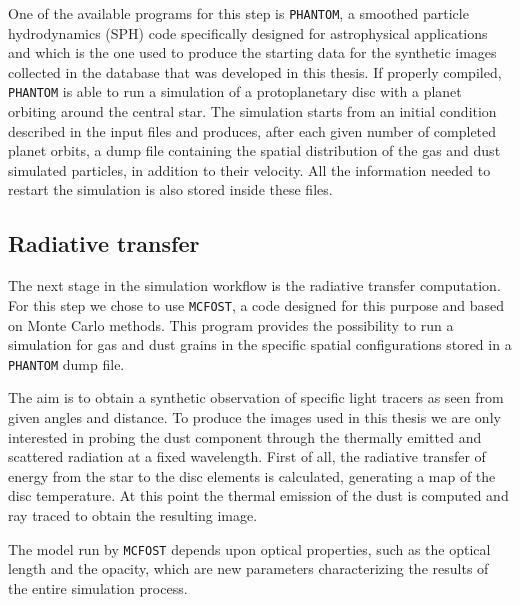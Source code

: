 \documentclass[a4paper,10pt]{report}
\begin{document}
One of the available programs for this step is \lstinline{PHANTOM}, a smoothed particle hydrodynamics (SPH) code 
specifically designed for astrophysical applications and which is the one used to produce
the starting data for the synthetic images collected in the database that was developed in this thesis.
If properly compiled, \lstinline{PHANTOM} is able to run a simulation of a protoplanetary disc with a planet orbiting around the central star. 
The simulation starts from an initial condition described in the input files and produces, after each given number of completed planet orbits, a dump file
containing the spatial distribution of the gas and dust simulated particles, in addition to their velocity. 
All the information needed to restart the simulation is also stored inside these files.

\subsection{Radiative transfer}

The next stage in the simulation workflow is the radiative transfer computation. For this
step we chose to use \lstinline{MCFOST}, a code designed for this purpose and based on Monte Carlo methods.
This program provides the possibility to run a simulation for gas and dust grains in the specific 
spatial configurations stored in a \lstinline{PHANTOM} dump file.

The aim is to obtain a synthetic observation of specific light tracers as seen from given angles and distance.
To produce the images used in this thesis we are only interested in probing the dust component through the thermally
emitted and scattered radiation at a fixed wavelength.
First of all, the radiative transfer of energy from the star to the disc elements is calculated, generating a map of the disc temperature.
At this point the thermal emission of the dust is computed and ray traced to obtain the resulting image.

The model run by \lstinline{MCFOST} depends upon optical properties, such as the optical length and the opacity, which 
are new parameters characterizing the results of the entire simulation process.
\end{document}
